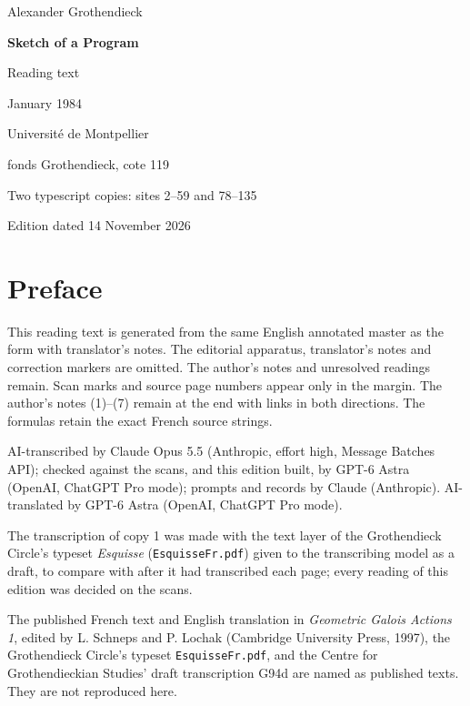 \documentclass[11pt,a4paper]{article}
\newcommand{\EditionTitle}{Sketch of a Program}
\newcommand{\EditionForm}{Reading text}
\begin{document}
\hypersetup{pageanchor=false}
\begin{titlepage}
\centering
\vspace*{18mm}
{\Large Alexander Grothendieck\par}
\vspace{12mm}
{\Huge\bfseries\EditionTitle\par}
\vspace{8mm}
{\Large\EditionForm\par}
\vspace{14mm}
{\large January 1984\par}
\vfill
{\large Université de Montpellier\par fonds Grothendieck, cote 119\par}
\vspace{8mm}
{\normalsize Two typescript copies: sites 2--59 and 78--135\par}
\vspace{8mm}
{\normalsize Edition dated 14 November 2026\par}
\end{titlepage}
\hypersetup{pageanchor=true}
\thispagestyle{plain}
\section*{Preface}

This reading text is generated from the same English annotated master as the form with translator’s notes. The editorial apparatus, translator’s notes and correction markers are omitted. The author’s notes and unresolved readings remain. Scan marks and source page numbers appear only in the margin. The author’s notes (1)–(7) remain at the end with links in both directions. The formulas retain the exact French source strings.

\smallskip
AI-transcribed by Claude Opus 5.5 (Anthropic, effort high, Message Batches API); checked against the scans, and this edition built, by GPT-6 Astra (OpenAI, ChatGPT Pro mode); prompts and records by Claude (Anthropic).
AI-translated by GPT-6 Astra (OpenAI, ChatGPT Pro mode).

The transcription of copy 1 was made with the text layer of the Grothendieck Circle's typeset \textit{Esquisse} (\texttt{EsquisseFr.pdf}) given to the transcribing model as a draft, to compare with after it had transcribed each page; every reading of this edition was decided on the scans.

The published French text and English translation in \textit{Geometric Galois Actions 1}, edited by L. Schneps and P. Lochak (Cambridge University Press, 1997), the Grothendieck Circle's typeset \texttt{EsquisseFr.pdf}, and the Centre for Grothendieckian Studies' draft transcription G94d are named as published texts. They are not reproduced here.
\end{document}
